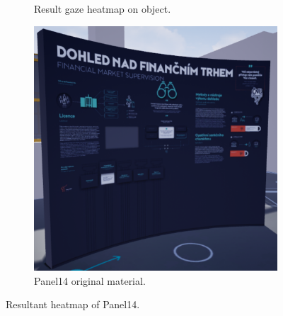 \begin{figure}[!ht]
\begin{subfigure}[b]{0.325\textwidth}
        \caption{Result gaze heatmap on object.}
    \end{subfigure}
    \hfill
    \begin{subfigure}[b]{0.32\textwidth}
        \centering
        \includegraphics[width=\textwidth]{img/data/Panel14/resultant/original.png}
        \caption{Panel14 original material.}
    \end{subfigure}
    \caption{Resultant heatmap of Panel14.}
    \label{fig:Panel14-resultant-heatmaps.}
\end{figure}



